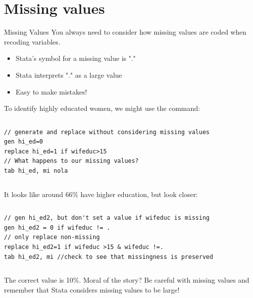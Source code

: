 \documentclass[table,smaller]{beamer}
\begin{document}
\section{Missing values}
\label{sec-4}

\begin{frame}[fragile,label=sec-4-1]{Missing Values}
 You always need to consider how missing values are coded when recoding variables.

\begin{itemize}
\item Stata's symbol for a missing value is "."
\item Stata interprets "." as a large value
\item Easy to make mistakes!
\end{itemize}
To identify highly educated women, we might use the command:

\vspace{-.5em} \begin{columns}  \begin{block}{}
\begin{verbatim}
// generate and replace without considering missing values
gen hi_ed=0
replace hi_ed=1 if wifeduc>15
// What happens to our missing values?
tab hi_ed, mi nola
\end{verbatim}
\end{block} \end{columns}

It looks like around 66\% have higher education, but look closer:

\vspace{-.5em} \begin{columns}  \begin{block}{}
\begin{verbatim}
// gen hi_ed2, but don't set a value if wifeduc is missing
gen hi_ed2 = 0 if wifeduc != . 
// only replace non-missing
replace hi_ed2=1 if wifeduc >15 & wifeduc !=. 
tab hi_ed2, mi //check to see that missingness is preserved
\end{verbatim}
\end{block} \end{columns}

The correct value is 10\%. Moral of the story? Be careful with missing values and remember that Stata considers missing values to be large!
\end{frame}
\end{document}
